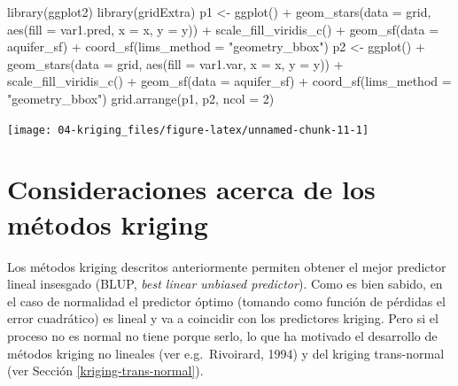 \documentclass[
  spanish,
]{book}
\newenvironment{Shaded}{\begin{snugshade}}{\end{snugshade}}
\newcommand{\AttributeTok}[1]{\textcolor[rgb]{0.77,0.63,0.00}{#1}}
\newcommand{\DecValTok}[1]{\textcolor[rgb]{0.00,0.00,0.81}{#1}}
\newcommand{\FunctionTok}[1]{\textcolor[rgb]{0.00,0.00,0.00}{#1}}
\newcommand{\NormalTok}[1]{#1}
\newcommand{\OtherTok}[1]{\textcolor[rgb]{0.56,0.35,0.01}{#1}}
\newcommand{\SpecialCharTok}[1]{\textcolor[rgb]{0.00,0.00,0.00}{#1}}
\newcommand{\StringTok}[1]{\textcolor[rgb]{0.31,0.60,0.02}{#1}}
\theoremstyle{break}
\theoremstyle{definition}
\theoremstyle{definition}
\theoremstyle{definition}
\theoremstyle{definition}
\theoremstyle{remark}
\begin{document}
\begin{Shaded}
\begin{Highlighting}[]
\FunctionTok{library}\NormalTok{(ggplot2)}
\FunctionTok{library}\NormalTok{(gridExtra)}
\NormalTok{p1 }\OtherTok{\textless{}{-}} \FunctionTok{ggplot}\NormalTok{() }\SpecialCharTok{+} \FunctionTok{geom\_stars}\NormalTok{(}\AttributeTok{data =}\NormalTok{ grid, }\FunctionTok{aes}\NormalTok{(}\AttributeTok{fill =}\NormalTok{ var1.pred, }\AttributeTok{x =}\NormalTok{ x, }\AttributeTok{y =}\NormalTok{ y)) }\SpecialCharTok{+}
    \FunctionTok{scale\_fill\_viridis\_c}\NormalTok{() }\SpecialCharTok{+} \FunctionTok{geom\_sf}\NormalTok{(}\AttributeTok{data =}\NormalTok{ aquifer\_sf) }\SpecialCharTok{+}
    \FunctionTok{coord\_sf}\NormalTok{(}\AttributeTok{lims\_method =} \StringTok{"geometry\_bbox"}\NormalTok{)}
\NormalTok{p2 }\OtherTok{\textless{}{-}} \FunctionTok{ggplot}\NormalTok{() }\SpecialCharTok{+} \FunctionTok{geom\_stars}\NormalTok{(}\AttributeTok{data =}\NormalTok{ grid, }\FunctionTok{aes}\NormalTok{(}\AttributeTok{fill =}\NormalTok{ var1.var, }\AttributeTok{x =}\NormalTok{ x, }\AttributeTok{y =}\NormalTok{ y)) }\SpecialCharTok{+}
    \FunctionTok{scale\_fill\_viridis\_c}\NormalTok{() }\SpecialCharTok{+} \FunctionTok{geom\_sf}\NormalTok{(}\AttributeTok{data =}\NormalTok{ aquifer\_sf) }\SpecialCharTok{+}
    \FunctionTok{coord\_sf}\NormalTok{(}\AttributeTok{lims\_method =} \StringTok{"geometry\_bbox"}\NormalTok{)}
\FunctionTok{grid.arrange}\NormalTok{(p1, p2, }\AttributeTok{ncol =} \DecValTok{2}\NormalTok{)}
\end{Highlighting}
\end{Shaded}

\begin{center}\texttt{[image: 04-kriging\_files/figure-latex/unnamed-chunk-11-1]} \end{center}

\hypertarget{consideraciones-kriging}{%
\section{Consideraciones acerca de los métodos kriging}\label{consideraciones-kriging}}

Los métodos kriging descritos anteriormente permiten obtener el mejor predictor lineal insesgado (BLUP, \emph{best linear unbiased predictor}).
Como es bien sabido, en el caso de normalidad el predictor óptimo (tomando como función de pérdidas el error cuadrático) es lineal y va a coincidir con los predictores kriging.
Pero si el proceso no es normal no tiene porque serlo, lo que ha motivado el desarrollo de métodos kriging no lineales (ver e.g.~Rivoirard, 1994) y del kriging trans-normal (ver Sección \ref{kriging-trans-normal}).
\end{document}
